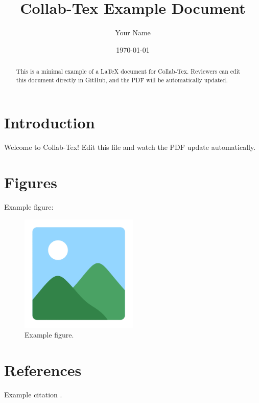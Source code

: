 \documentclass[12pt]{article}
\title{Collab-Tex Example Document}
\author{Your Name}
\date{\today}
\begin{document}
\maketitle

\begin{abstract}
This is a minimal example of a LaTeX document for Collab-Tex.
Reviewers can edit this document directly in GitHub, and the PDF will be automatically updated.
\end{abstract}

\section{Introduction}

Welcome to Collab-Tex! Edit this file and watch the PDF update automatically.

\section{Figures}

Example figure:

\begin{figure}[h]
\centering
\includegraphics[width=0.5\textwidth]{figures/example-image.png}
\caption{Example figure.}
\end{figure}

\section{References}

Example citation \cite{example2025}.



\end{document}
